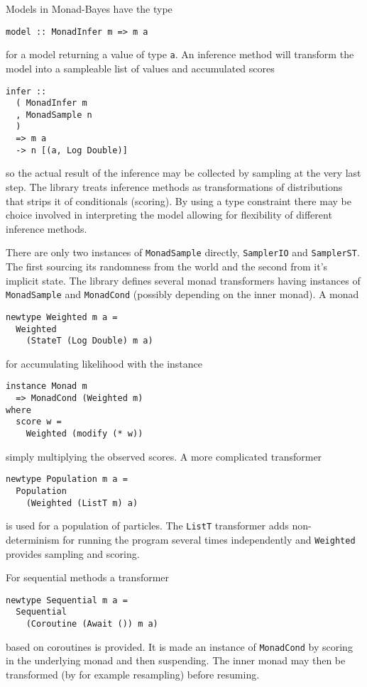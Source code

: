 Models in Monad-Bayes have the type
\begin{verbatim}
model :: MonadInfer m => m a
\end{verbatim}
for a model returning a value of type \texttt{a}. An inference method will transform the model into a sampleable list of values and accumulated scores
\begin{verbatim}
infer ::
  ( MonadInfer m
  , MonadSample n
  )
  => m a
  -> n [(a, Log Double)]
\end{verbatim}
so the actual result of the inference may be collected by sampling at the very last step. The library treats inference methods as transformations of distributions that strips it of conditionals (scoring). By using a type constraint there may be choice involved in interpreting the model allowing for flexibility of different inference methods.

There are only two instances of \texttt{MonadSample} directly, \texttt{SamplerIO} and \texttt{SamplerST}. The first sourcing its randomness from the world and the second from it's implicit state. The library defines several monad transformers having instances of \texttt{MonadSample} and \texttt{MonadCond} (possibly depending on the inner monad). A monad
\begin{verbatim}
newtype Weighted m a =
  Weighted
    (StateT (Log Double) m a)
\end{verbatim}
for accumulating likelihood with the instance
\begin{verbatim}
instance Monad m
  => MonadCond (Weighted m)
where
  score w =
    Weighted (modify (* w))
\end{verbatim}
simply multiplying the observed scores. A more complicated transformer
\begin{verbatim}
newtype Population m a =
  Population
    (Weighted (ListT m) a)
\end{verbatim}
is used for a population of particles. The \texttt{ListT} transformer adds non-determinism for running the program several times independently and \texttt{Weighted} provides sampling and scoring.

For sequential methods a transformer
\begin{verbatim}
newtype Sequential m a =
  Sequential
    (Coroutine (Await ()) m a)
\end{verbatim}
based on coroutines is provided. It is made an instance of \texttt{MonadCond} by scoring in the underlying monad and then suspending. The inner monad may then be transformed (by for example resampling) before resuming.


